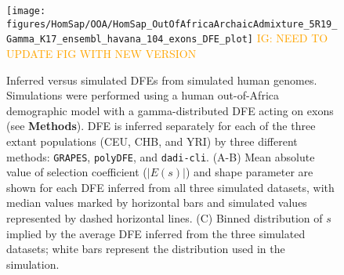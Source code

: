 \documentclass[hidelinks]{article}
\newcommand{\polydfe}{\texttt{polyDFE}\xspace}
\newcommand{\dadicli}{\texttt{dadi-cli}\xspace}
\newcommand{\grapes}{\texttt{GRAPES}\xspace}
\newcommand{\igcomment}[1]{\textcolor{orange}{IG: #1}}
\begin{document}
    \begin{figure}[b!]
        \centering
        \texttt{[image: figures/HomSap/OOA/HomSap\_OutOfAfricaArchaicAdmixture\_5R19\_Gamma\_K17\_ensembl\_havana\_104\_exons\_DFE\_plot]}
        \igcomment{NEED TO UPDATE FIG WITH NEW VERSION}
        \caption{Inferred versus simulated DFEs from simulated human genomes.
        Simulations were performed using a human out-of-Africa demographic model with a gamma-distributed DFE
        acting on exons (see \textbf{Methods}).
        DFE is inferred separately for each of the three extant populations (CEU, CHB, and YRI)
        by three different methods: \grapes, \polydfe , and \dadicli.
        (A-B) Mean absolute value of selection coefficient ($\lvert E(s) \rvert $) and shape parameter are
        shown for each DFE inferred from all three simulated datasets,
        with median values marked by horizontal bars
        and simulated values represented by dashed horizontal lines.
        (C) Binned distribution of $s$ implied by the average DFE inferred from the three simulated datasets;
        white bars represent the distribution used in the simulation.
        }
        \label{fig:homsap-dfe.ooa}
    \end{figure}
\end{document}
